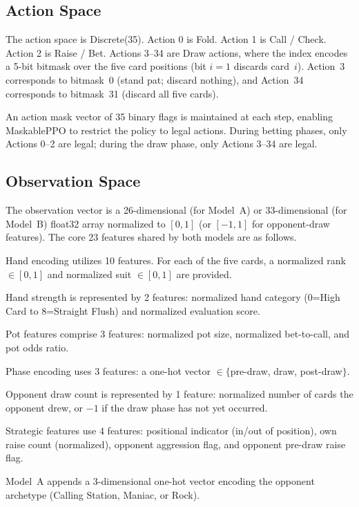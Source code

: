 \documentclass[conference]{IEEEtran}
\begin{document}
\subsection{Action Space}

The action space is Discrete(35). Action 0 is Fold. Action 1 is Call / Check. Action 2 is Raise / Bet. Actions 3--34 are Draw actions, where the index encodes a 5-bit bitmask over the five card positions (bit $i = 1$ discards card~$i$). Action~3 corresponds to bitmask~0 (stand pat; discard nothing), and Action~34 corresponds to bitmask~31 (discard all five cards).

An action mask vector of 35 binary flags is maintained at each
step, enabling MaskablePPO \cite{huang2022closer} to restrict the
policy to legal actions. During betting phases, only Actions 0--2
are legal; during the draw phase, only Actions 3--34 are legal.

\subsection{Observation Space}

The observation vector is a 26-dimensional (for Model~A) or
33-dimensional (for Model~B) float32 array normalized to $[0,1]$
(or $[-1,1]$ for opponent-draw features). The core 23 features
shared by both models are as follows.

Hand encoding utilizes 10 features. For each of the five cards, a normalized rank $\in [0,1]$ and normalized suit $\in [0,1]$ are provided.

Hand strength is represented by 2 features: normalized hand category (0=High Card to 8=Straight Flush) and normalized evaluation score.

Pot features comprise 3 features: normalized pot size, normalized bet-to-call, and pot odds ratio.

Phase encoding uses 3 features: a one-hot vector $\in \{$pre-draw, draw, post-draw$\}$.

Opponent draw count is represented by 1 feature: normalized number of cards the opponent drew, or $-1$ if the draw phase has not yet occurred.

Strategic features use 4 features: positional indicator (in/out of position), own raise count (normalized), opponent aggression flag, and opponent pre-draw raise flag.

Model~A appends a 3-dimensional one-hot vector encoding
the opponent archetype (Calling Station, Maniac, or Rock).
\end{document}

